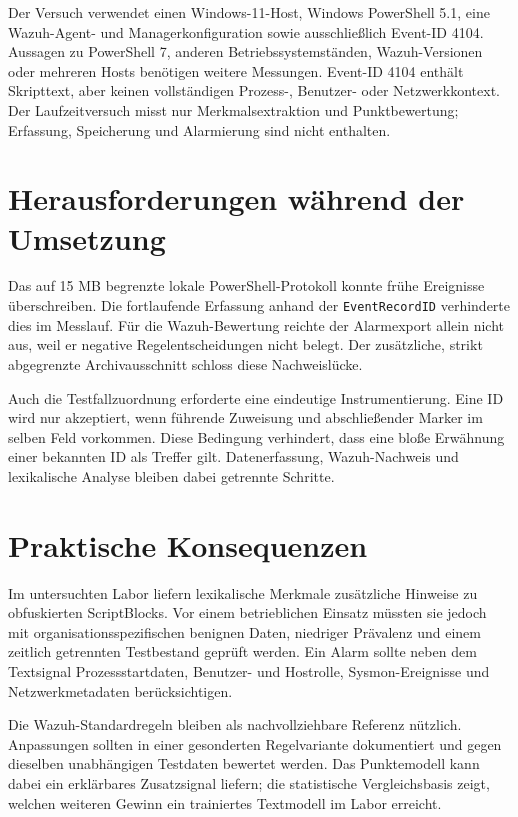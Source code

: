 \documentclass[12pt,a4paper,oneside,parskip=half]{scrreprt}
\begin{document}
Der Versuch verwendet einen Windows-11-Host, Windows PowerShell 5.1, eine Wazuh-Agent- und Managerkonfiguration sowie ausschließlich Event-ID 4104. Aussagen zu PowerShell 7, anderen Betriebssystemständen, Wazuh-Versionen oder mehreren Hosts benötigen weitere Messungen. Event-ID 4104 enthält Skripttext, aber keinen vollständigen Prozess-, Benutzer- oder Netzwerkkontext. Der Laufzeitversuch misst nur Merkmalsextraktion und Punktbewertung; Erfassung, Speicherung und Alarmierung sind nicht enthalten.

\section{Herausforderungen während der Umsetzung}
Das auf 15 MB begrenzte lokale PowerShell-Protokoll konnte frühe Ereignisse überschreiben. Die fortlaufende Erfassung anhand der \texttt{EventRecordID} verhinderte dies im Messlauf. Für die Wazuh-Bewertung reichte der Alarmexport allein nicht aus, weil er negative Regelentscheidungen nicht belegt. Der zusätzliche, strikt abgegrenzte Archivausschnitt schloss diese Nachweislücke.

Auch die Testfallzuordnung erforderte eine eindeutige Instrumentierung. Eine ID wird nur akzeptiert, wenn führende Zuweisung und abschließender Marker im selben Feld vorkommen. Diese Bedingung verhindert, dass eine bloße Erwähnung einer bekannten ID als Treffer gilt. Datenerfassung, Wazuh-Nachweis und lexikalische Analyse bleiben dabei getrennte Schritte.

\section{Praktische Konsequenzen}
Im untersuchten Labor liefern lexikalische Merkmale zusätzliche Hinweise zu obfuskierten ScriptBlocks. Vor einem betrieblichen Einsatz müssten sie jedoch mit organisationsspezifischen benignen Daten, niedriger Prävalenz und einem zeitlich getrennten Testbestand geprüft werden. Ein Alarm sollte neben dem Textsignal Prozessstartdaten, Benutzer- und Hostrolle, Sysmon-Ereignisse und Netzwerkmetadaten berücksichtigen.

Die Wazuh-Standardregeln bleiben als nachvollziehbare Referenz nützlich. Anpassungen sollten in einer gesonderten Regelvariante dokumentiert und gegen dieselben unabhängigen Testdaten bewertet werden. Das Punktemodell kann dabei ein erklärbares Zusatzsignal liefern; die statistische Vergleichsbasis zeigt, welchen weiteren Gewinn ein trainiertes Textmodell im Labor erreicht.
\end{document}
